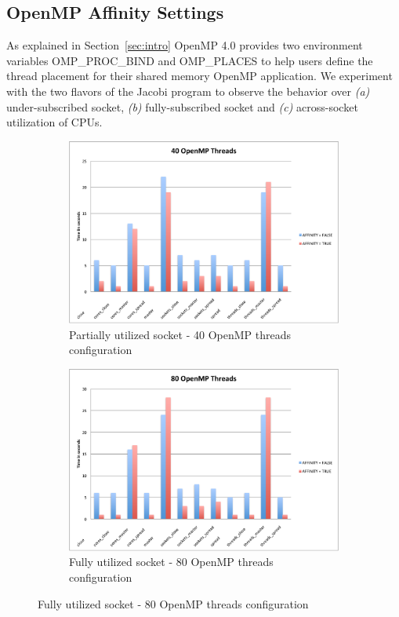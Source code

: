 \subsection{OpenMP Affinity Settings}
As explained in Section~\ref{sec:intro} OpenMP 4.0 provides two environment variables OMP\_PROC\_BIND and OMP\_PLACES to help users define the thread placement for their shared memory OpenMP application. We experiment with the two flavors of the Jacobi program to observe the behavior over \textit{(a)} under-subscribed socket, \textit{(b)} fully-subscribed socket and \textit{(c)} across-socket utilization of CPUs. 
%
\begin{figure}[!h]
    \centering
    \begin{subfigure}[b]{0.5\textwidth}
        \includegraphics[width=\textwidth]{./Images/J40_time_bar}
        \caption{Partially utilized socket - 40 OpenMP threads configuration}
        \label{fig:J40}
    \end{subfigure}
  
    \begin{subfigure}[b]{0.5\textwidth}
        \includegraphics[width=\textwidth]{./Images/J80_time_bar}
        \caption{Fully utilized socket - 80 OpenMP threads configuration}
        \label{fig:J80}
    \end{subfigure}
  

\end{figure}
